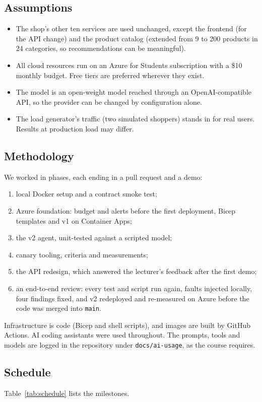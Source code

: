 \documentclass[conference]{IEEEtran}
\begin{document}
\subsection{Assumptions}
\begin{itemize}
\item The shop's other ten services are used unchanged, except the frontend
(for the API change) and the product catalog (extended from 9 to 200
products in 24 categories, so recommendations can be meaningful).
\item All cloud resources run on an Azure for Students subscription with a
\$10 monthly budget. Free tiers are preferred wherever they exist.
\item The model is an open-weight model reached through an OpenAI-compatible
API, so the provider can be changed by configuration alone.
\item The load generator's traffic (two simulated shoppers) stands in for
real users. Results at production load may differ.
\end{itemize}

\subsection{Methodology}
We worked in phases, each ending in a pull request and a demo:
\begin{enumerate}
\item local Docker setup and a contract smoke test;
\item Azure foundation: budget and alerts before the first deployment,
Bicep templates and v1 on Container Apps;
\item the v2 agent, unit-tested against a scripted model;
\item canary tooling, criteria and measurements;
\item the API redesign, which answered the lecturer's feedback after the
first demo;
\item an end-to-end review: every test and script run again, faults
injected locally, four findings fixed, and v2 redeployed and re-measured on
Azure before the code was merged into \texttt{main}.
\end{enumerate}
Infrastructure is code (Bicep and shell scripts), and images are built by
GitHub Actions. AI coding assistants were used throughout. The prompts,
tools and models are logged in the repository under
\texttt{docs/ai-usage}, as the course requires.

\subsection{Schedule}
Table~\ref{tab:schedule} lists the milestones.
\end{document}
